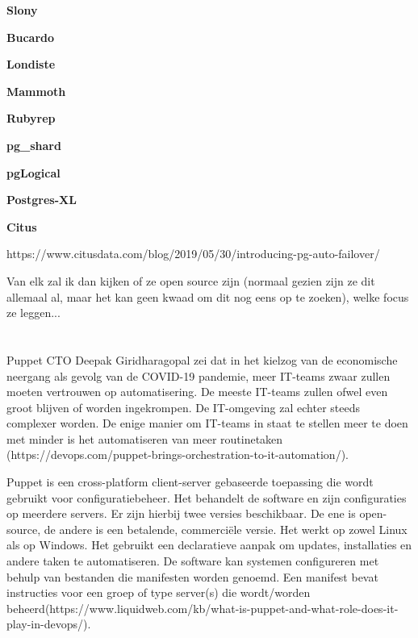 \textbf{Slony}



\textbf{Bucardo}



\textbf{Londiste}



\textbf{Mammoth}



\textbf{Rubyrep}



\textbf{pg\_shard}



\textbf{pgLogical}



\textbf{Postgres-XL}



\textbf{Citus}

https://www.citusdata.com/blog/2019/05/30/introducing-pg-auto-failover/






Van elk zal ik dan kijken of ze open source zijn (normaal gezien zijn ze dit allemaal al, maar het kan geen kwaad om dit nog eens op te zoeken), welke focus ze leggen...






\section{}
\label{sec:Puppet}

Puppet CTO Deepak Giridharagopal zei dat in het kielzog van de economische neergang als gevolg van de COVID-19 pandemie, meer IT-teams zwaar zullen moeten vertrouwen op automatisering. De meeste IT-teams zullen ofwel even groot blijven of worden ingekrompen. De IT-omgeving zal echter steeds complexer worden. De enige manier om IT-teams in staat te stellen meer te doen met minder is het automatiseren van meer routinetaken (https://devops.com/puppet-brings-orchestration-to-it-automation/).

Puppet is een cross-platform client-server gebaseerde toepassing die wordt gebruikt voor configuratiebeheer. Het behandelt de software en zijn configuraties op meerdere servers. Er zijn hierbij twee versies beschikbaar. De ene is open-source, de andere is een betalende, commerciële versie. Het werkt op zowel Linux als op Windows. Het gebruikt een declaratieve aanpak om updates, installaties en andere taken te automatiseren. De software kan systemen configureren met behulp van bestanden die manifesten worden genoemd. Een manifest bevat instructies voor een groep of type server(s) die wordt/worden beheerd(https://www.liquidweb.com/kb/what-is-puppet-and-what-role-does-it-play-in-devops/). 

